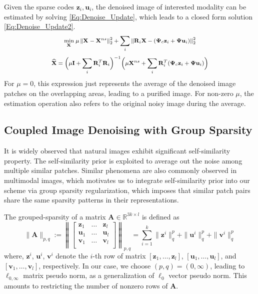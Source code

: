 \documentclass{article}
\newcommand{\mypar}[1]{\bigskip\noindent {\bf #1.}}
\begin{document}
\mypar{Step 2: Reconstruction}
Given the sparse codes $\mathbf{z}_i,\mathbf{u}_i$, the denoised image of interested modality can be estimated by solving \eqref{Eq:Denoise_Update}, which leads to a closed form solution \eqref{Eq:Denoise_Update2}.
\begin{equation} \label{Eq:Denoise_Update}
\footnotesize
\underset{\mathbf{X}_{} }{\min} \;
\mu \left\| \mathbf{X}_{} - \mathbf{X}^{ns}_{} \right\|_2^2
+
\sum_i
\left\| \mathbf{R}_i \mathbf{X} - ( \boldsymbol{\Psi}_{c} \mathbf{z}_i + \boldsymbol{\Psi} \mathbf{u}_i) \right\|_2^2
\end{equation}
\begin{equation} \label{Eq:Denoise_Update2}
\footnotesize
\mathbf{\widehat{X}} = \Big( \mu \mathbf{I} + \sum_{i} \mathbf{R}_i^T \mathbf{R}_i \Big)^{-1} 
\Big( \mu \mathbf{X}^{ns} + \sum_i \mathbf{R}_i^T (\boldsymbol{\Psi}_{c} \mathbf{z}_i + \boldsymbol{\Psi} \mathbf{u}_i) \Big) 
\end{equation} 
For $\mu = 0$, this expression just represents the average of the denoised image patches on the overlapping areas, leading to a purified image. For non-zero $\mu$, the estimation operation also refers to the original noisy image during the average.




\subsection{Coupled Image Denoising with Group Sparsity}
It is widely observed that natural images exhibit significant self-similarity property. The self-similarity prior is exploited to average out the noise among multiple similar patches\cite{dabov2007image,mairal2009non}. Similar phenomena are also commonly observed in multimodal images, which motivates us to integrate self-similarity prior into our scheme via group sparsity regularization, which imposes that similar patch pairs share the same sparsity patterns in their representations.




The grouped-sparsity of a matrix $\mathbf{A} \in \mathbb{R}^{3k \times l}$ is defined as
$$
\|\mathbf{A} \|_{p,q} := 
\left\|
\begin{bmatrix}
\mathbf{z}_1 & \ldots & \mathbf{z}_l \\
\mathbf{u}_1 & \ldots & \mathbf{u}_l \\
\mathbf{v}_1 & \ldots & \mathbf{v}_l \\
\end{bmatrix}
\right\|_{p,q}
=
\sum_{i=1}^{k} 
\| \mathbf{z}^i \|_q^p + \| \mathbf{u}^i \|_q^p + \| \mathbf{v}^i \|_q^p
$$
where, $\mathbf{z}^i$, $\mathbf{u}^i$, $\mathbf{v}^i$ denote the $i$-th row of matrix $[\mathbf{z}_1, \ldots, \mathbf{z}_l]$, $[\mathbf{u}_1, \ldots, \mathbf{u}_l]$, and $[\mathbf{v}_1, \ldots, \mathbf{v}_l]$, respectively. In our case, we choose $(p,q) = (0,\infty)$, leading to $\ell_{0,\infty}$ matrix pseudo norm, as a generalization of $\ell_0$ vector pseudo norm. This amounts to restricting the number of nonzero rows of $\mathbf{A}$. 
\end{document}
